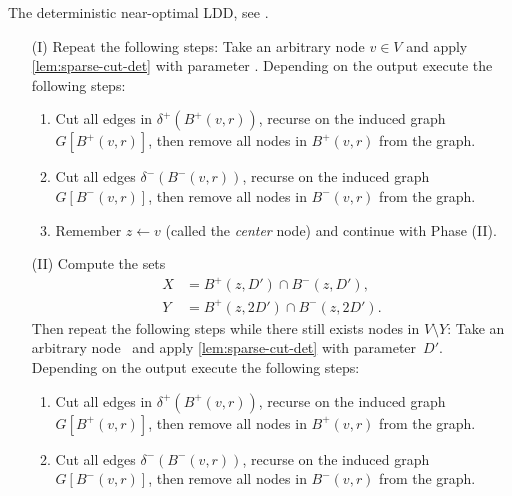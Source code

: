 \documentclass[letterpaper,11pt]{article}
\begin{document}
\begin{algorithm}[t]
	\caption{The deterministic near-optimal LDD, see .} \label{alg:det}
	\begin{enumerate}[label=\arabic*.]
		\item[(I)] Repeat the following steps: Take an arbitrary node $v \in V$ and apply \cref{lem:sparse-cut-det} with parameter . Depending on the output execute the following steps:
		\begin{enumerate}[label=(\roman*)]
			\item Cut all edges in $\delta^+(B^+(v, r))$, recurse on the induced graph $G[B^+(v, r)]$, then remove all nodes in $B^+(v, r)$ from the graph.
			\item Cut all edges $\delta^-(B^-(v, r))$, recurse on the induced graph $G[B^-(v, r)]$, then remove all nodes in $B^-(v, r)$ from the graph.
			\item Remember $z \gets v$ (called the \emph{center} node) and continue with Phase (II).
		\end{enumerate}
		\item[(II)] Compute the sets
		\begin{align*}
			X &= B^+(z, D') \cap B^-(z, D'), \\
			Y &= B^+(z, 2D') \cap B^-(z, 2D').
		\end{align*}
		Then repeat the following steps while there still exists nodes in $V \setminus Y$: Take an arbitrary node~ and apply \cref{lem:sparse-cut-det} with parameter~$D'$. Depending on the output execute the following steps:
		\begin{enumerate}[label=(\roman*)]
			\item Cut all edges in $\delta^+(B^+(v, r))$, recurse on the induced graph $G[B^+(v, r)]$, then remove all nodes in $B^+(v, r)$ from the graph.
			\item Cut all edges $\delta^-(B^-(v, r))$, recurse on the induced graph $G[B^-(v, r)]$, then remove all nodes in $B^-(v, r)$ from the graph.
		\end{enumerate}
	\end{enumerate}
\end{algorithm}
\end{document}

